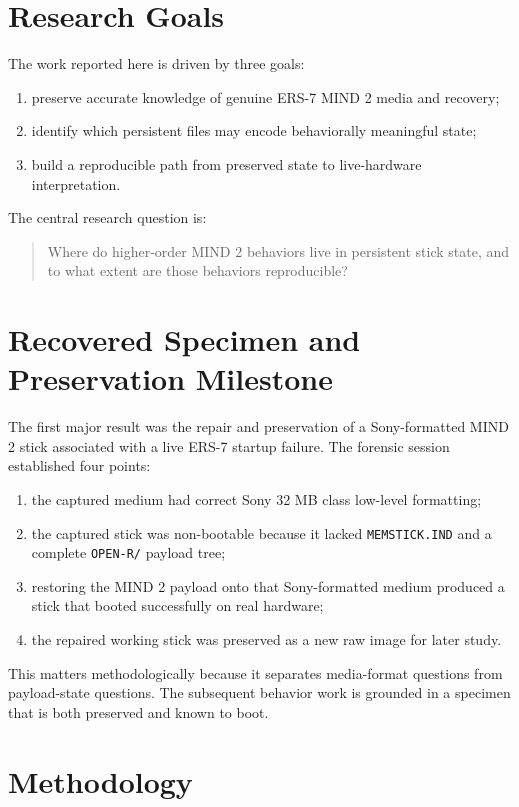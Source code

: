 \section{Research Goals}
The work reported here is driven by three goals:
\begin{enumerate}[leftmargin=*]
\item preserve accurate knowledge of genuine ERS-7 MIND 2 media and recovery;
\item identify which persistent files may encode behaviorally meaningful state;
\item build a reproducible path from preserved state to live-hardware
interpretation.
\end{enumerate}

The central research question is:

\begin{quote}
Where do higher-order MIND 2 behaviors live in persistent stick state, and to
what extent are those behaviors reproducible?
\end{quote}

\section{Recovered Specimen and Preservation Milestone}
The first major result was the repair and preservation of a Sony-formatted MIND
2 stick associated with a live ERS-7 startup failure. The forensic session
established four points:
\begin{enumerate}[leftmargin=*]
\item the captured medium had correct Sony 32 MB class low-level formatting;
\item the captured stick was non-bootable because it lacked
\texttt{MEMSTICK.IND} and a complete \texttt{OPEN-R/} payload tree;
\item restoring the MIND 2 payload onto that Sony-formatted medium produced a
stick that booted successfully on real hardware;
\item the repaired working stick was preserved as a new raw image for later
study.
\end{enumerate}

This matters methodologically because it separates media-format questions from
payload-state questions. The subsequent behavior work is grounded in a specimen
that is both preserved and known to boot.

\section{Methodology}
